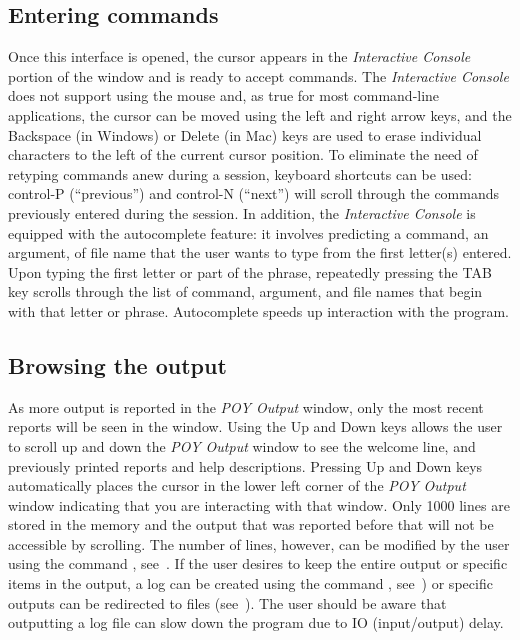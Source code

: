 {\subsection{Entering commands}
Once this \poy interface is opened, the cursor appears in the \emph{Interactive Console} portion of the window 
and is ready to accept commands. The \emph{Interactive Console} does not support using the mouse and, as true for most 
command-line applications, the cursor can be moved using the left and right arrow keys, and the Backspace (in Windows) 
or Delete (in Mac) keys are used to erase individual characters to the left of the current cursor position. To eliminate 
the need of retyping commands anew during a \poy session, keyboard shortcuts can be used: control-P (``previous'') 
and control-N (``next'') will scroll through the commands previously entered during the session. In addition, the 
\emph{Interactive Console} is equipped with the autocomplete feature: it involves \poy predicting a command, an argument, 
of file name that the user wants to type from the first letter(s) entered. Upon typing the first letter or part of the phrase, 
repeatedly pressing the TAB key scrolls through the list of command, argument, and file names that begin with that 
letter or phrase. Autocomplete speeds up interaction with the program.

\subsection{Browsing the output}
As more output is reported in the \emph{POY Output} window, only the most recent reports will be seen in the window. 
Using the Up and Down keys allows the user to scroll up and down the \emph{POY Output} window to see the welcome 
line, and previously printed reports and help descriptions. Pressing Up and Down keys automatically places the cursor in 
the lower left corner of the \emph{POY Output} window indicating that you are interacting with that window. Only 1000 
lines are stored in the memory and the output that was reported before that will not be accessible by scrolling. The number 
of lines, however, can be modified by the user using the command , see~. If the user 
desires to keep the entire output or specific items in the output, a log can be created using the command , 
see~) or specific outputs can be redirected to files (see~).  The user should be aware that 
outputting a log file can slow down the program due to IO (input/output) delay.

}
